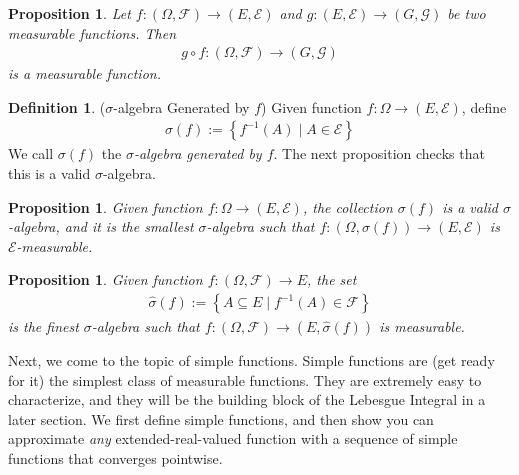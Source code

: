 \documentclass[12pt]{article}
\theoremstyle{plain}
\newtheorem{prop}[thm]{Proposition}
\theoremstyle{definition}
\newtheorem{defn}[thm]{Definition}
\theoremstyle{remark}
\newcommand{\ra}{\rightarrow}
\newcommand{\sG}{\mathscr{G}}
\newcommand{\sE}{\mathscr{E}}
\newcommand{\sF}{\mathscr{F}}
\newcommand{\calF}{\mathcal{F}}
\begin{document}




\begin{prop}
Let $f:(\Omega,\sF)\ra(E,\sE)$ and $g:(E,\sE)\ra (G,\sG)$ be two
measurable functions. Then
\begin{align*}
  g\circ f: (\Omega,\sF) \ra (G,\sG)
\end{align*}
is a measurable function.
\end{prop}

\begin{defn}($\sigma$-algebra Generated by $f$)
Given function $f:\Omega\ra (E,\sE)$, define
\begin{align*}
  \sigma(f):=\left\{ f^{-1}(A) \; |\; A \in\sE \right\}
\end{align*}
We call $\sigma(f)$ the \emph{$\sigma$-algebra generated by $f$}. The
next proposition checks that this is a valid $\sigma$-algebra.
\end{defn}

\begin{prop}
Given function $f:\Omega\ra (E,\sE)$, the collection $\sigma(f)$ is a
valid $\sigma$-algebra, and it is the smallest $\sigma$-algebra such
that $f:(\Omega,\sigma(f))\ra (E,\sE)$ is $\sE$-measurable.
\end{prop}

\begin{prop}
Given function $f:(\Omega,\sF)\ra E$, the set
\begin{align*}
  \hat{\sigma}(f)
  :=
  \left\{ A\subseteq E \; |\; f^{-1}(A)\in\sF \right\}
\end{align*}
is the finest $\sigma$-algebra such that
$f:(\Omega,\sF)\ra (E,\hat{\sigma}(f))$ is measurable.
\end{prop}

Next, we come to the topic of simple functions. Simple functions are
(get ready for it) the simplest class of measurable functions. They are
extremely easy to characterize, and they will be the building block of
the Lebesgue Integral in a later section. We first define simple
functions, and then show you can approximate \emph{any}
extended-real-valued function with a sequence of simple functions that
converges pointwise.
\end{document}
